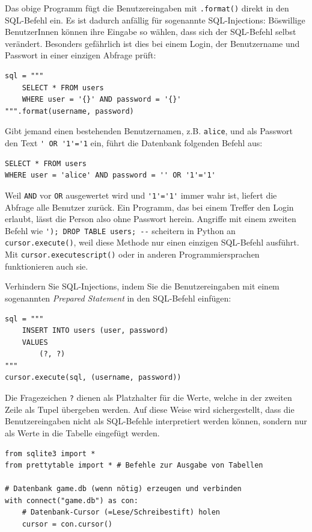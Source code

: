 \begin{mychallenge}
    Das obige Programm fügt die Benutzereingaben mit \lstinline|.format()| direkt in den SQL-Befehl ein. Es ist dadurch anfällig für sogenannte SQL-Injections: Böswillige BenutzerInnen können ihre Eingabe so wählen, dass sich der SQL-Befehl selbst verändert. Besonders gefährlich ist dies bei einem Login, der Benutzername und Passwort in einer einzigen Abfrage prüft:
\begin{lstlisting}
sql = """
    SELECT * FROM users
    WHERE user = '{}' AND password = '{}'
""".format(username, password)
\end{lstlisting}
    Gibt jemand einen bestehenden Benutzernamen, z.B. \texttt{alice}, und als Passwort den Text \lstinline|' OR '1'='1| ein, führt die Datenbank folgenden Befehl aus:
\begin{lstlisting}[style=sql]
SELECT * FROM users
WHERE user = 'alice' AND password = '' OR '1'='1'
\end{lstlisting}
    Weil \lstinline[style=sql]|AND| vor \lstinline[style=sql]|OR| ausgewertet wird und \lstinline[style=sql]|'1'='1'| immer wahr ist, liefert die Abfrage alle Benutzer zurück. Ein Programm, das bei einem Treffer den Login erlaubt, lässt die Person also ohne Passwort herein. Angriffe mit einem zweiten Befehl wie \lstinline[style=sql]|'); DROP TABLE users; --| scheitern in Python an \lstinline|cursor.execute()|, weil diese Methode nur einen einzigen SQL-Befehl ausführt. Mit \lstinline|cursor.executescript()| oder in anderen Programmiersprachen funktionieren auch sie.

    Verhindern Sie SQL-Injections, indem Sie die Benutzereingaben mit einem sogenannten \textit{Prepared Statement} in den SQL-Befehl einfügen:
    \begin{lstlisting}
sql = """
    INSERT INTO users (user, password)
    VALUES
        (?, ?)
"""
cursor.execute(sql, (username, password))
\end{lstlisting}
Die Fragezeichen \lstinline|?| dienen als Platzhalter für die Werte, welche in der zweiten Zeile als Tupel übergeben werden. Auf diese Weise wird sichergestellt, dass die Benutzereingaben nicht als SQL-Befehle interpretiert werden können, sondern nur als Werte in die Tabelle eingefügt werden.
    \begin{myanswer}
        \begin{lstlisting}
from sqlite3 import *
from prettytable import * # Befehle zur Ausgabe von Tabellen

# Datenbank game.db (wenn nötig) erzeugen und verbinden
with connect("game.db") as con:
    # Datenbank-Cursor (=Lese/Schreibestift) holen
    cursor = con.cursor()


\end{lstlisting}
\end{myanswer}
\end{mychallenge}
